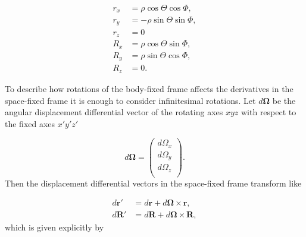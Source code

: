 \begin{equation}
\begin{aligned}
	r_x &= \rho \cos\Theta\cos\Phi,\\
	r_y &= -\rho \sin\Theta\sin\Phi,\\
	r_z &= 0\\
	R_x &= \rho \cos\Theta\sin\Phi,\\
	R_y &= \rho \sin\Theta\cos\Phi,\\
	R_z &= 0.
\end{aligned}   
\end{equation}

To describe how rotations of the body-fixed frame affects the derivatives in the space-fixed frame it is enough to consider infinitesimal rotations.  Let $d\mathbf{\Omega}$ be the angular displacement differential vector of the rotating axes $xyz$ with respect to the fixed axes $x'y'z'$

\begin{equation}
d\mathbf{\Omega} =
\begin{pmatrix}
d\Omega_x\\
d\Omega_y\\
d\Omega_z\\
\end{pmatrix}.
\end{equation}
Then the displacement differential vectors in the space-fixed frame transform like


\begin{subequations}
\begin{align}
	d{\mathbf{r}}' &= d\mathbf{r} + d\mathbf{\Omega} \times \mathbf{r},\\
	d{\mathbf{R}}' &= d\mathbf{R} + d\mathbf{\Omega} \times \mathbf{R},
\end{align}
\end{subequations}   
which is given explicitly by

